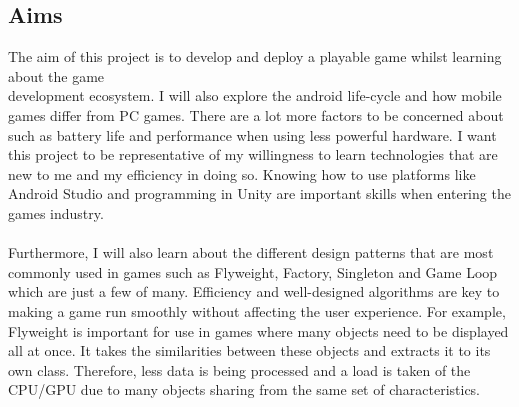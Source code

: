 \documentclass[a4paper]{report}
\begin{document}
\subsection{Aims}
The aim of this project is to develop and deploy a playable game whilst learning about the game \\development ecosystem. I will also explore the android life-cycle and how mobile games differ from PC games. There are a lot more factors to be concerned about such as battery life and performance when using less powerful hardware. I want this project to be representative of my willingness to learn technologies that are new to me and my efficiency in doing so. Knowing how to use platforms like Android Studio and programming in Unity are important skills when entering the games industry.  
\\\\
Furthermore, I will also learn about the different design patterns that are most commonly used in games such as Flyweight, Factory, Singleton and Game Loop which are just a few of many. Efficiency and well-designed algorithms are key to making a game run smoothly without affecting the user experience. For example, Flyweight is important for use in games where many objects need to be displayed all at once. It takes the similarities between these objects and extracts it to its own class. Therefore, less data is being processed and a load is taken of the CPU/GPU due to many objects sharing from the same set of characteristics. \cite{Flyweight}
\end{document}
